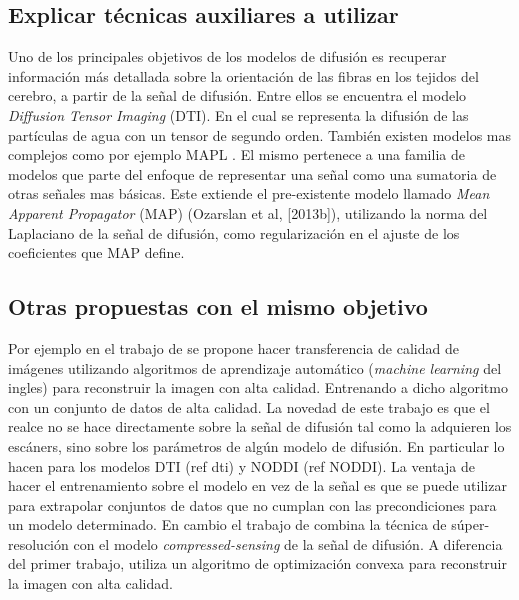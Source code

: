 \documentclass[a4paper,10pt]{article}
\begin{document}
\subsection{Explicar técnicas auxiliares a utilizar}
Uno de los principales objetivos de los modelos de difusión es recuperar información más detallada 
sobre la orientación de las fibras en los tejidos del cerebro, a partir de la señal de difusión. Entre ellos se 
encuentra el modelo \textit{Diffusion Tensor Imaging} (DTI). En el cual se representa la difusión de las partículas de 
agua con un tensor de segundo orden. También existen modelos mas complejos como por ejemplo MAPL \citep{Fick2016365}. El 
mismo pertenece a una familia de modelos que parte del enfoque de representar una señal como una sumatoria de otras 
señales mas básicas. 
Este extiende el pre-existente modelo llamado \textit{Mean Apparent Propagator} (MAP) (Ozarslan et al, [2013b]), 
utilizando la norma del Laplaciano de la se\~nal de difusión, como regularizaci\'on en el ajuste de los coeficientes que 
MAP define. 


\subsection{Otras propuestas con el mismo objetivo}
Por ejemplo en el trabajo de \citet{Alexander2014} se propone hacer transferencia de 
calidad de imágenes utilizando algoritmos de aprendizaje automático 
(\textit{machine learning} del ingles) para reconstruir la imagen con alta 
calidad. Entrenando a dicho algoritmo con un conjunto de datos de alta 
calidad. La novedad de este trabajo es que el realce no se hace directamente 
sobre la señal de difusión tal como la adquieren los escáners, sino sobre los 
parámetros de algún modelo de difusión. En particular lo hacen para los modelos DTI 
(ref dti) y NODDI (ref NODDI). La ventaja de hacer el entrenamiento sobre el modelo en vez de la 
se\~nal es que se puede utilizar para extrapolar conjuntos de datos que no cumplan con 
las precondiciones para un modelo determinado. En cambio el trabajo de \citet{Ning2016} combina la 
t\'ecnica de súper-resolución con el modelo \textit{compressed-sensing} \citep{Naidoo2015} de la señal de difusión. A 
diferencia del primer trabajo, utiliza un algoritmo de 
optimización convexa para reconstruir la imagen con alta calidad.
\end{document}
